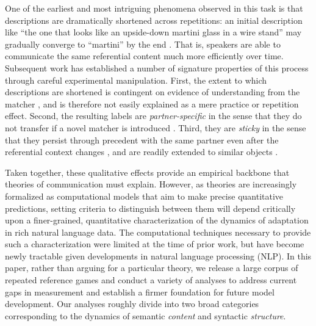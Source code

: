 \documentclass[alpha-refs]{wiley-article}
\begin{document}
One of the earliest and most intriguing phenomena observed in this task is that descriptions are dramatically shortened across repetitions: an initial description like ``the one that looks like an upside-down martini glass in a wire stand'' may gradually converge to ``martini'' by the end  \citep{KraussWeinheimer64_ReferencePhrases}. 
That is, speakers are able to communicate the same referential content much more efficiently over time.
Subsequent work has established a number of signature properties of this process through careful experimental manipulation.
First, the extent to which descriptions are shortened is contingent on evidence of understanding from the matcher \citep{KraussWeinheimer66_Tangrams,KraussEtAl77_AudioVisualBackChannel,HupetChantraine92_CollaborationOrRepitition}, and is therefore not easily explained as a mere practice or repetition effect.
Second, the resulting labels are \emph{partner-specific} in the sense that they do not transfer if a novel matcher is introduced \citep{WilkesGibbsClark92_CoordinatingBeliefs,MetzingBrennan03_PartnerSpecificPacts,brennan_partner-specific_2009}.
Third, they are \emph{sticky} in the sense that they persist through precedent with the same partner even after the referential context changes \citep{BrennanClark96_ConceptualPactsConversation}, and are readily extended to similar objects \citep{MarkmanMakin98_ReferentialCommunicationCategory}.

Taken together, these qualitative effects provide an empirical backbone that theories of communication must explain. %
However, as theories are increasingly formalized as computational models that aim to make precise quantitative predictions, setting criteria to distinguish between them will depend critically upon a finer-grained, quantitative characterization of the dynamics of adaptation in rich natural language data.
The computational techniques necessary to provide such a characterization were limited at the time of prior work, but have become newly tractable given developments in natural language processing (NLP).
In this paper, rather than arguing for a particular theory, we release a large corpus of repeated reference games and conduct a variety of analyses to address current gaps in measurement and establish a firmer foundation for future model development.
Our analyses roughly divide into two broad categories corresponding to the dynamics of semantic \emph{content} and syntactic \emph{structure}.
\end{document}

